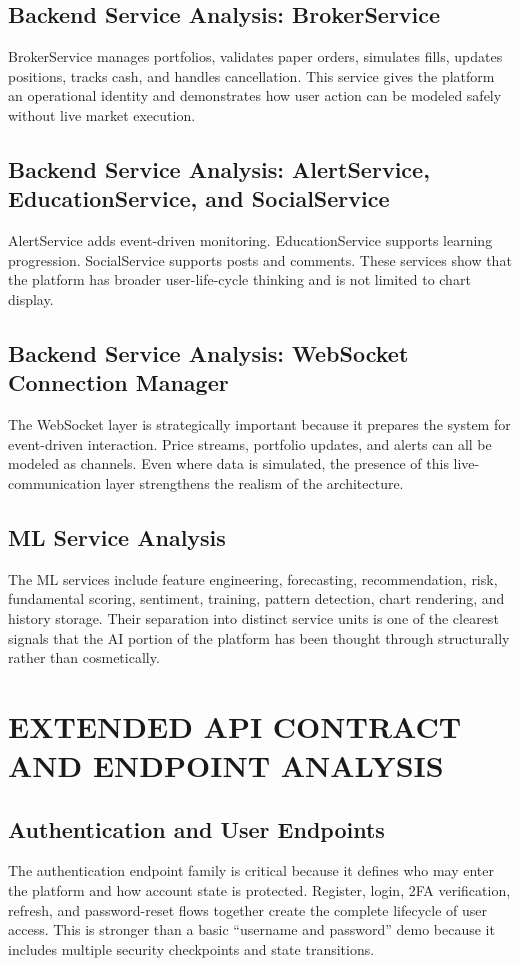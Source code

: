 \documentclass[12pt,a4paper]{report}
\begin{document}
\section{Backend Service Analysis: BrokerService}
BrokerService manages portfolios, validates paper orders, simulates fills, updates positions, tracks cash, and handles cancellation. This service gives the platform an operational identity and demonstrates how user action can be modeled safely without live market execution.

\section{Backend Service Analysis: AlertService, EducationService, and SocialService}
AlertService adds event-driven monitoring. EducationService supports learning progression. SocialService supports posts and comments. These services show that the platform has broader user-life-cycle thinking and is not limited to chart display.

\section{Backend Service Analysis: WebSocket Connection Manager}
The WebSocket layer is strategically important because it prepares the system for event-driven interaction. Price streams, portfolio updates, and alerts can all be modeled as channels. Even where data is simulated, the presence of this live-communication layer strengthens the realism of the architecture.

\section{ML Service Analysis}
The ML services include feature engineering, forecasting, recommendation, risk, fundamental scoring, sentiment, training, pattern detection, chart rendering, and history storage. Their separation into distinct service units is one of the clearest signals that the AI portion of the platform has been thought through structurally rather than cosmetically.

\chapter{EXTENDED API CONTRACT AND ENDPOINT ANALYSIS}
\section{Authentication and User Endpoints}
The authentication endpoint family is critical because it defines who may enter the platform and how account state is protected. Register, login, 2FA verification, refresh, and password-reset flows together create the complete lifecycle of user access. This is stronger than a basic ``username and password'' demo because it includes multiple security checkpoints and state transitions.
\end{document}
